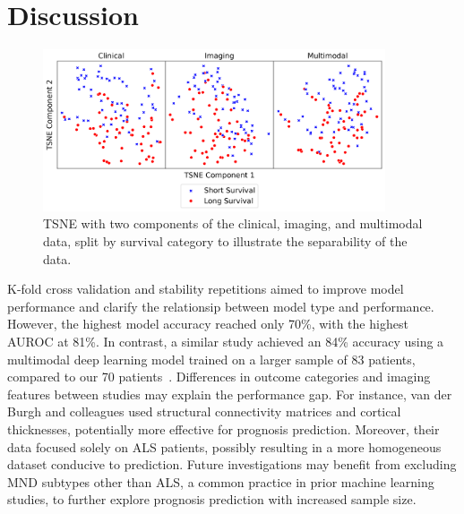 \section{Discussion}

\begin{figure}
    \centering
    \includegraphics[width=0.9\textwidth]{figures/tsne_plot}
    \caption{TSNE with two components of the clinical, imaging, and multimodal data, split by survival category to illustrate the separability of the data.}
    \label{fig:tsne}
\end{figure}

K-fold cross validation and stability repetitions aimed to improve model performance and clarify the relationsip between model type and performance.
However, the highest model accuracy reached only 70\%, with the highest AUROC at 81\%.
In contrast, a similar study achieved an 84\% accuracy using a multimodal deep learning model trained on a larger sample of 83 patients, compared to our 70 patients~\cite{vanderburghDeepLearningPredictions2017}.
Differences in outcome categories and imaging features between studies may explain the performance gap.
For instance, van der Burgh and colleagues used structural connectivity matrices and cortical thicknesses, potentially more effective for prognosis prediction.
Moreover, their data focused solely on ALS patients, possibly resulting in a more homogeneous dataset conducive to prediction.
Future investigations may benefit from excluding MND subtypes other than ALS, a common practice in prior machine learning studies, to further explore prognosis prediction with increased sample size.



